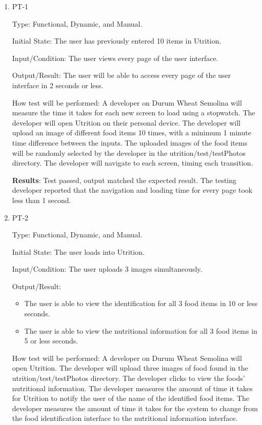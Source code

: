 \documentclass[12pt, titlepage]{article}
\begin{document}
	\begin{enumerate}
		
		\item{PT-1} 
		
		Type: Functional, Dynamic, and Manual.
		
		Initial State: The user has previously entered 10 items in Utrition.
		
		Input/Condition: The user views every page of the user interface.
		
		Output/Result: The user will be able to access every page of the user interface in 2 seconds or less.
		
		How test will be performed: A developer on Durum Wheat Semolina will measure the time it takes for each new screen to load using a stopwatch. The developer will open Utrition on their personal device. The developer will upload an image of different food items 10 times, with a minimum 1 minute time difference between the inputs. The uploaded images of the food items will be randomly selected by the developer in the utrition/test/testPhotos directory. The developer will navigate to each screen, timing each transition.
		
		\textbf{Results}: Test passed, output matched the expected result. The testing developer reported that the navigation and loading time for every page took less than 1 second.
		
		\item{PT-2} 
		
		Type: Functional, Dynamic, and Manual.
		
		Initial State: The user loads into Utrition.
		
		Input/Condition: The user uploads 3 images simultaneously.
		
		Output/Result: 
		\begin{itemize}
			\item The user is able to view the identification for all 3 food items in 10 or less seconds.
			\item The user is able to view the nutritional information for all 3 food items in 5 or less seconds.
		\end{itemize}
		
		How test will be performed: A developer on Durum Wheat Semolina will 
		open Utrition. The developer 
		will upload three images of food found in the utrition/test/testPhotos 
		directory. The developer clicks to view 
		the foods’ nutritional information. The developer measures the amount 
		of time it takes for Utrition to notify the user of the name of the 
		identified food items. The developer measures the amount of time it 
		takes for the system to change from the food identification interface 
		to the nutritional information interface.
		

\end{enumerate}
\end{document}
